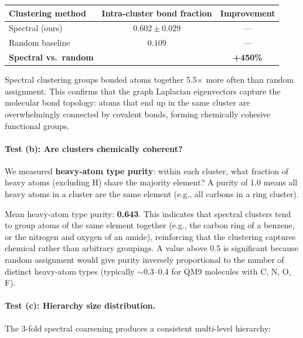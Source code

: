 \documentclass[12pt,a4paper]{article}
\begin{document}
\begin{validationbox}
\begin{center}
\begin{tabular}{lcc}
\toprule
\textbf{Clustering method} & \textbf{Intra-cluster bond fraction} & \textbf{Improvement} \\
\midrule
Spectral (ours) & $0.602 \pm 0.029$ & --- \\
Random baseline & $0.109$ & --- \\
\midrule
\textbf{Spectral vs.\ random} & & \textbf{+450\%} \\
\bottomrule
\end{tabular}
\end{center}
Spectral clustering groups bonded atoms together 5.5$\times$ more often than random assignment. This confirms that the graph Laplacian eigenvectors capture the molecular bond topology: atoms that end up in the same cluster are overwhelmingly connected by covalent bonds, forming chemically cohesive functional groups.
\end{validationbox}

\paragraph{Test (b): Are clusters chemically coherent?}
We measured \textbf{heavy-atom type purity}: within each cluster, what fraction of heavy atoms (excluding H) share the majority element? A purity of 1.0 means all heavy atoms in a cluster are the same element (e.g., all carbons in a ring cluster).

\begin{validationbox}
Mean heavy-atom type purity: \textbf{0.643}. This indicates that spectral clusters tend to group atoms of the same element together (e.g., the carbon ring of a benzene, or the nitrogen and oxygen of an amide), reinforcing that the clustering captures chemical rather than arbitrary groupings. A value above 0.5 is significant because random assignment would give purity inversely proportional to the number of distinct heavy-atom types (typically $\sim$0.3--0.4 for QM9 molecules with C, N, O, F).
\end{validationbox}

\paragraph{Test (c): Hierarchy size distribution.}
The 3-fold spectral coarsening produces a consistent multi-level hierarchy:
\end{document}
